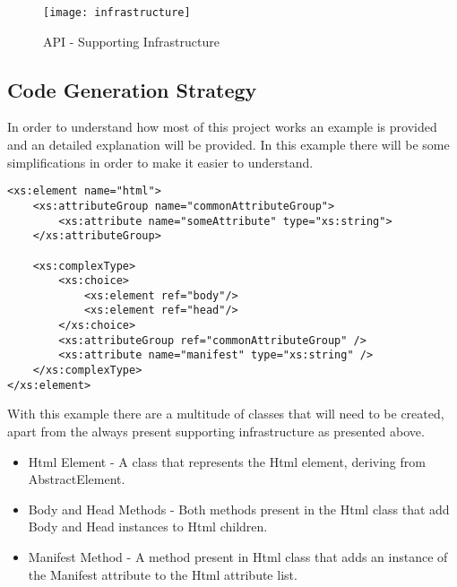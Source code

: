 \begin{figure}[ht]
	\centering
	\texttt{[image: infrastructure]}
	\caption{API - Supporting Infrastructure}
	\label{img:infrastructure}
\end{figure}

\subsection{Code Generation Strategy}
\label{sec:codegenerationstrategy}

In order to understand how most of this project works an example is provided and an detailed explanation will be provided. In this example there will be some simplifications in order to make it easier to understand.


\begin{minipage}{\linewidth}
\begin{lstlisting}[caption={Code Generation XSD Example},captionpos=b]
<xs:element name="html">
    <xs:attributeGroup name="commonAttributeGroup">
        <xs:attribute name="someAttribute" type="xs:string">
    </xs:attributeGroup>

    <xs:complexType>
        <xs:choice>
            <xs:element ref="body"/>
            <xs:element ref="head"/>
        </xs:choice>
        <xs:attributeGroup ref="commonAttributeGroup" />
        <xs:attribute name="manifest" type="xs:string" />
    </xs:complexType>
</xs:element>
\end{lstlisting}
\end{minipage}

\noindent
With this example there are a multitude of classes that will need to be created, apart from the always present supporting infrastructure as presented above. 

\begin{itemize}
	\item Html Element - A class that represents the Html element, deriving from AbstractElement.
	\item Body and Head Methods - Both methods present in the Html class that add Body and Head instances to Html children.
	\item Manifest Method - A method present in Html class that adds an instance of the Manifest attribute to the Html attribute list.
\end{itemize}

